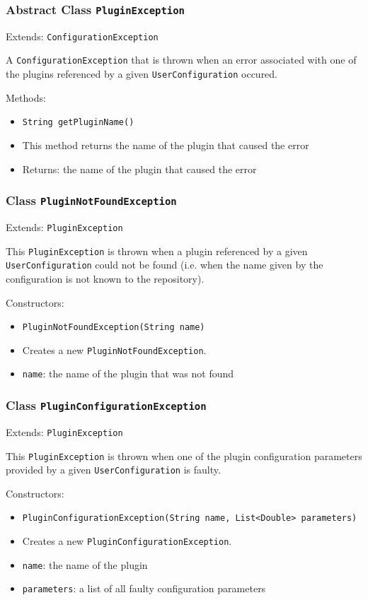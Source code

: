 \documentclass[parskip=full,11pt]{scrartcl}
\begin{document}
\subsubsection{Abstract Class \texttt{PluginException}}
Extends: \texttt{ConfigurationException}

A \texttt{ConfigurationException} that is thrown when an error associated with one of the plugins referenced by a given \texttt{UserConfiguration} occured.

Methods:
\begin{itemize} \itemsep -10pt
	\item \texttt{String getPluginName()}
	\item[] This method returns the name of the plugin that caused the error
	\item[] Returns: the name of the plugin that caused the error
\end{itemize}

\subsubsection{Class \texttt{PluginNotFoundException}}
Extends: \texttt{PluginException}

This \texttt{PluginException} is thrown when a plugin referenced by a given \texttt{UserConfiguration} could not be found (i.e. when the name given by the configuration is not known to the repository).

Constructors:
\begin{itemize} \itemsep -10pt
	\item \texttt{PluginNotFoundException(String name)}
	\item[] Creates a new \texttt{PluginNotFoundException}.
	\item[] \texttt{name}: the name of the plugin that was not found
\end{itemize}

\subsubsection{Class \texttt{PluginConfigurationException}}
Extends: \texttt{PluginException}

This \texttt{PluginException} is thrown when one of the plugin configuration parameters provided by a given \texttt{UserConfiguration} is faulty.

Constructors:
\begin{itemize}\itemsep -10pt
	\item \texttt{PluginConfigurationException(String name, List<Double> parameters)}
	\item[] Creates a new \texttt{PluginConfigurationException}.
	\item[] \texttt{name}: the name of the plugin
	\item[] \texttt{parameters}: a list of all faulty configuration parameters
\end{itemize}
\end{document}
